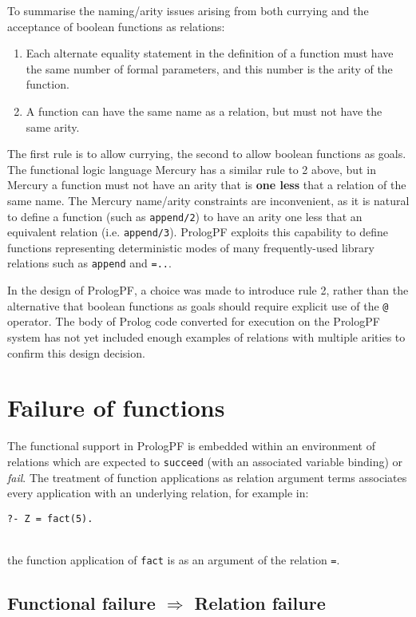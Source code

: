 To summarise the naming/arity issues arising from both currying and the
acceptance of boolean functions as relations:
\begin{enumerate}
\item{Each alternate equality statement in the definition of a function must
  have the same number of formal parameters, and this number is the arity of
  the function.}
\item{A function can have the same name as a relation, but must not have
  the same arity.}
\end{enumerate}
The first rule is to allow currying, the second to allow boolean functions as
goals.  The functional logic language Mercury has a similar rule to 2 above,
but in Mercury a function must not have an arity that is \textbf{one less} that a
relation of the same name.  The Mercury name/arity constraints are inconvenient,
as it is natural to define a function (such as \texttt{append/2}) to have an
arity one less that an equivalent relation (i.e. \texttt{append/3}).  PrologPF
exploits this capability to define functions representing deterministic modes
of many frequently-used
library relations such as \texttt{append} and \texttt{=..}.

In the design of PrologPF, a choice was made to introduce rule 2, rather than
the alternative that boolean functions as goals should require explicit use of 
the \texttt{@} operator.  The body of Prolog code converted for execution on
the PrologPF system has not yet included enough examples of relations with
multiple arities to confirm this design decision.

\section{Failure of functions} %
\label{fail}

The functional support in PrologPF is embedded within an environment of
relations which are expected to \texttt{succeed} (with an associated
variable binding) or \textit{fail}.  The treatment of function applications as
relation argument terms associates every application with an underlying relation,
for example in:\\
\centerline{\texttt{?- Z = fact(5).}}\\
the function application of \texttt{fact} is as an argument of the
relation \texttt{=}.

\subsection{Functional failure $\Rightarrow$ Relation failure}
\label{func_fail}

